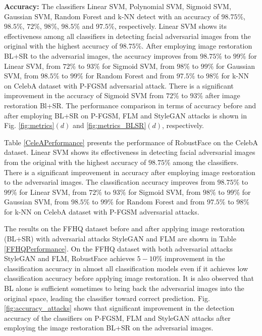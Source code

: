 \documentclass[sn-mathphys]{sn-jnl}%
\theoremstyle{thmstyleone}%
\theoremstyle{thmstyletwo}%
\theoremstyle{thmstylethree}%
\begin{document}
\textbf{Accuracy:} The classifiers Linear SVM, Polynomial SVM, Sigmoid SVM, Gaussian SVM, Random Forest and k-NN detect with an accuracy of $98.75\%$, $98.5\%$, $72\%$, $98\%$, $98.5\%$ and $97.5\%$, respectively. Linear SVM shows its effectiveness among all classifiers in detecting facial adversarial images from the original with the highest accuracy of $98.75\%$. After employing image restoration BL+SR to the adversarial images, the accuracy improves from $98.75\%$ to $99\%$ for Linear SVM, from $72\%$ to $93\%$ for Sigmoid SVM, from $98\%$ to $99\%$ for Gaussian SVM, from $98.5\%$ to $99\%$ for Random Forest and from $97.5\%$ to $98\%$ for k-NN on CelebA dataset with P-FGSM adversarial attack. There is a significant improvement in the accuracy of Sigmoid SVM from $72\%$ to $93\%$ after image restoration Bl+SR. The performance comparison in terms of accuracy before and after employing BL+SR on P-FGSM, FLM and StyleGAN attacks is shown in Fig. \ref{fig:metrics}$(d)$ and \ref{fig:metrics_BLSR}$(d)$, respectively.

Table \ref{CeleAPerformance} presents the performance of RobustFace on the CelebA dataset.  Linear SVM shows its effectiveness in detecting facial adversarial images from the original with the highest accuracy of $98.75\%$ among the classifiers. There is a significant improvement in accuracy after employing image restoration to the adversarial images. The classification accuracy improves from $98.75\%$ to $99\%$ for Linear SVM, from $72\%$ to $93\%$ for Sigmoid SVM, from $98\%$ to $99\%$ for Gaussian SVM, from $98.5\%$ to $99\%$ for Random Forest and from $97.5\%$ to $98\%$ for k-NN on CelebA dataset with P-FGSM adversarial attacks.

The results on the FFHQ dataset before and after applying image restoration (BL+SR) with adversarial attacks StyleGAN and FLM are shown in Table \ref{FFHQPerformance}. On the FFHQ dataset with both adversarial attacks StyleGAN and FLM, RobustFace achieves $5-10\%$ improvement in the classification accuracy in almost all classification models even if it achieves low classification accuracy before applying image restoration. It is also observed that BL alone is sufficient sometimes to bring back the adversarial images into the original space, leading the classifier toward correct prediction. Fig. \ref{fig:accuracy_attacks} shows that significant improvement in the detection accuracy of the classifiers on P-FGSM, FLM and StyleGAN attacks after employing the image restoration BL+SR on the adversarial images. 
\end{document}

